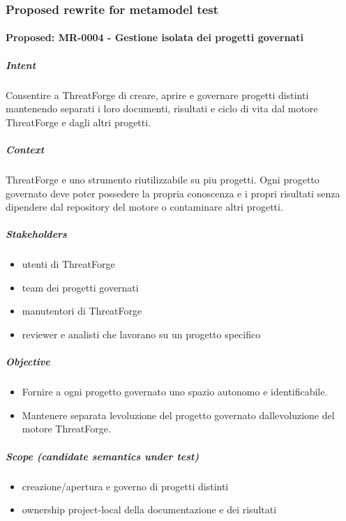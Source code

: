 \documentclass[
  10pt,
]{article}
\providecommand{\tightlist}{%
  \setlength{\itemsep}{0pt}\setlength{\parskip}{0pt}}
\begin{document}
\subsubsection{Proposed rewrite for metamodel
test}\label{proposed-rewrite-for-metamodel-test-3}

\paragraph{Proposed: MR-0004 - Gestione isolata dei progetti
governati}\label{proposed-mr-0004---gestione-isolata-dei-progetti-governati}

\subparagraph{Intent}\label{intent-8}

Consentire a ThreatForge di creare, aprire e governare progetti distinti
mantenendo separati i loro documenti, risultati e ciclo di vita dal
motore ThreatForge e dagli altri progetti.

\subparagraph{Context}\label{context-8}

ThreatForge e uno strumento riutilizzabile su piu progetti. Ogni
progetto governato deve poter possedere la propria conoscenza e i propri
risultati senza dipendere dal repository del motore o contaminare altri
progetti.

\subparagraph{Stakeholders}\label{stakeholders-4}

\begin{itemize}
\tightlist
\item
  utenti di ThreatForge
\item
  team dei progetti governati
\item
  manutentori di ThreatForge
\item
  reviewer e analisti che lavorano su un progetto specifico
\end{itemize}

\subparagraph{Objective}\label{objective-4}

\begin{itemize}
\tightlist
\item
  Fornire a ogni progetto governato uno spazio autonomo e
  identificabile.
\item
  Mantenere separata l\textquotesingle evoluzione del progetto governato
  dall\textquotesingle evoluzione del motore ThreatForge.
\end{itemize}

\subparagraph{Scope (candidate semantics under
test)}\label{scope-candidate-semantics-under-test-3}

\begin{itemize}
\tightlist
\item
  creazione/apertura e governo di progetti distinti
\item
  ownership project-local della documentazione e dei risultati
\end{itemize}
\end{document}
